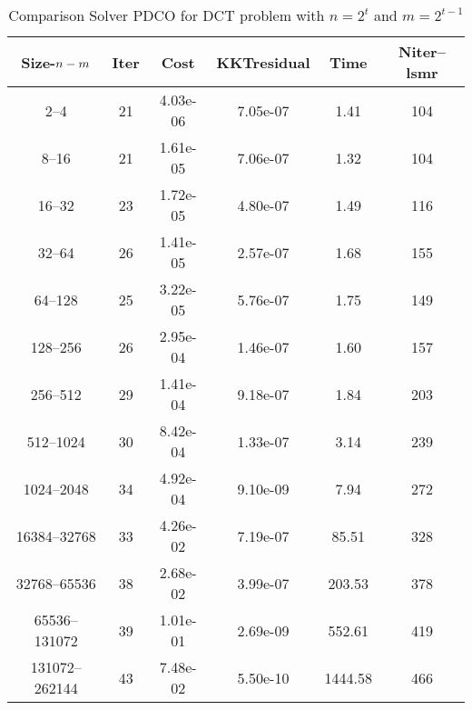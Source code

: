 \documentclass[letterpaper,12pt,oneside,final]{book}
\begin{document}
\begin{table}
\caption{Comparison Solver  PDCO  for  DCT problem with $n=2^{t}$ and $m=2^{t-1}$} 
\begin{center}
\begin{tabular}{|*{6}{c}|} \hline
Size-$n\--m$ & \multicolumn{1}{c}{Iter} & \multicolumn{1}{c}{Cost}& \multicolumn{1}{c}{KKTresidual} & \multicolumn{1}{c}{Time} & \multicolumn{1}{c|}{Niter--lsmr} \\ 
\hline

2--4    &21&    4.03e-06&     7.05e-07&     1.41&   104\\ 
8--16    &21&    1.61e-05&     7.06e-07&     1.32&   104\\ 
16--32    &23&    1.72e-05&     4.80e-07&     1.49&   116\\ 
32--64    &26&    1.41e-05&     2.57e-07&     1.68&   155\\ 
64--128    &25&    3.22e-05&     5.76e-07&     1.75&   149\\ 
128--256    &26&    2.95e-04&     1.46e-07&     1.60&   157\\ 
256--512    &29&    1.41e-04&     9.18e-07&     1.84&   203\\ 
512--1024    &30&    8.42e-04&     1.33e-07&     3.14&   239\\ 
1024--2048    &34&    4.92e-04&     9.10e-09&     7.94&   272\\ 
16384--32768    &33&    4.26e-02&     7.19e-07&     85.51&   328\\ 
32768--65536    &38&    2.68e-02&     3.99e-07&     203.53&   378\\ 
65536--131072    &39&    1.01e-01&     2.69e-09&     552.61&   419\\ 
131072--262144    &43&    7.48e-02&     5.50e-10&     1444.58&   466\\ 
\hline
\end{tabular}
\end{center}
\end{table}
\end{document}

